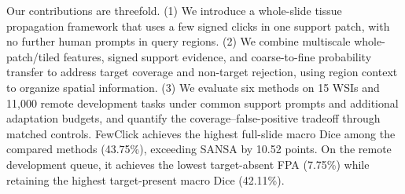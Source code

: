Our contributions are threefold. (1) We introduce a whole-slide tissue propagation framework that uses a few signed clicks in one support patch, with no further human prompts in query regions. (2) We combine multiscale whole-patch/tiled features, signed support evidence, and coarse-to-fine probability transfer to address target coverage and non-target rejection, using region context to organize spatial information. (3) We evaluate six methods on 15 WSIs and 11,000 remote development tasks under common support prompts and additional adaptation budgets, and quantify the coverage--false-positive tradeoff through matched controls. FewClick achieves the highest full-slide macro Dice among the compared methods (43.75\%), exceeding SANSA by 10.52 points. On the remote development queue, it achieves the lowest target-absent FPA (7.75\%) while retaining the highest target-present macro Dice (42.11\%).
